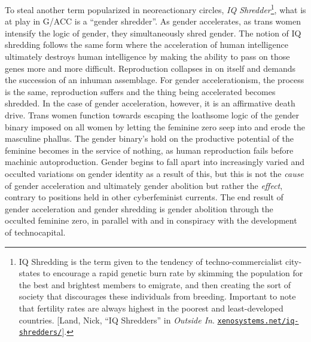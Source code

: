 \documentclass[10pt, statementpaper, twoside, openright]{memoir}
\begin{document}
To steal another term popularized in neoreactionary circles, \textit{IQ Shredder}\footnote{IQ Shredding is the term given to the tendency of techno-commercialist city-states to encourage a rapid genetic burn rate by skimming the population for the best and brightest members to emigrate, and then creating the sort of society that discourages these individuals from breeding. Important to note that fertility rates are always highest in the poorest and least-developed countries. [Land, Nick, ``IQ Shredders'' in \textit{Outside In}. \href{http://www.xenosystems.net/iq-shredders/}{\nolinkurl{xenosystems.net/iq-shredders/}}].}, what is at play in G/ACC is a ``gender shredder''. As gender accelerates, as trans women intensify the logic of gender, they simultaneously shred gender. The notion of IQ shredding follows the same form where the acceleration of human intelligence ultimately destroys human intelligence by making the ability to pass on those genes more and more difficult. Reproduction collapses in on itself and demands the succession of an inhuman assemblage. For gender accelerationism, the process is the same, reproduction suffers and the thing being accelerated becomes shredded. In the case of gender acceleration, however, it is an affirmative death drive. Trans women function towards escaping the loathsome logic of the gender binary imposed on all women by letting the feminine zero seep into and erode the masculine phallus. The gender binary's hold on the productive potential of the feminine becomes in the service of nothing, as human reproduction fails before machinic autoproduction. Gender begins to fall apart into increasingly varied and occulted variations on gender identity as a result of this, but this is not the \emph{cause} of gender acceleration and ultimately gender abolition but rather the \emph{effect}, contrary to positions held in other cyberfeminist currents. The end result of gender acceleration and gender shredding is gender abolition through the occulted feminine zero, in parallel with and in conspiracy with the development of technocapital.
\end{document}
